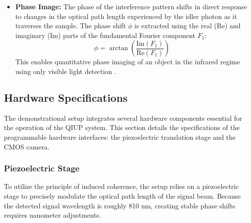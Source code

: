 \documentclass[12pt,a4paper]{article}
\begin{document}
\begin{itemize}
            \item \textbf{Phase Image:} The phase of the interference pattern shifts in direct response to changes in the optical path length experienced by the idler photon as it traverses the sample. The phase shift $\phi$ is extracted using the real (Re) and imaginary (Im) parts of the fundamental Fourier component $F_1$:
            \begin{equation}
                \phi = \arctan\left(\frac{\text{Im}(F_{1})}{\text{Re}(F_{1})}\right)
                \label{eq:phase}
            \end{equation}
            This enables quantitative phase imaging of an object in the infrared regime using only visible light detection \cite{pearce2023practical}.
        \end{itemize}

    \subsection{Hardware Specifications}
    The demonstrational setup integrates several hardware components essential for the operation of the \ac{QIUP} system. This section details the specifications of the programmable hardware interfaces: the piezoelectric translation stage and the \ac{CMOS} camera.

        \subsubsection{Piezoelectric Stage}
        To utilize the principle of induced coherence, the setup relies on a piezoelectric stage to precisely modulate the optical path length of the signal beam. Because the detected signal wavelength is roughly 810 nm, creating stable phase shifts requires nanometer adjustments.
        
\end{document}
